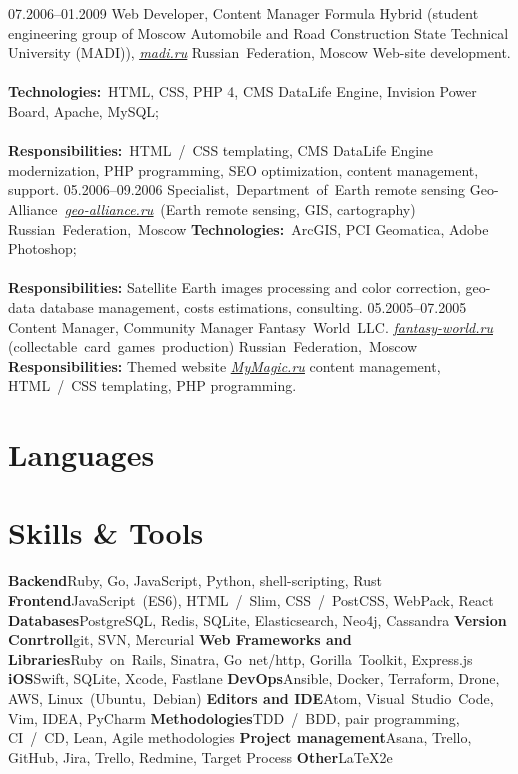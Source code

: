 \documentclass[12pt,a4paper,final]{moderncv}
\begin{document}
\newpage
\cventry
{07.2006--01.2009}
{Web Developer, Content Manager}
{
  Formula Hybrid (student engineering group of Moscow Automobile and Road Construction State Technical University (MADI)), \underline{\href{http://madi.ru}{\itshape madi.ru}}
}
{Russian~Federation, Moscow}
{}
{
  Web-site development.
  \\\\
  \textbf{Technologies:}~HTML, CSS, PHP 4, CMS DataLife Engine, Invision Power Board, Apache, MySQL;
  \\\\
  \textbf{Responsibilities:}~HTML~/~CSS templating, CMS DataLife Engine modernization, PHP programming, SEO optimization, content management, support.
}
%
\cventry
{05.2006--09.2006}
{Specialist,~Department~of~Earth remote sensing}
{Geo-Alliance~\underline{\href{http://geo-alliance.ru}{\itshape geo-alliance.ru}}~(Earth remote sensing, GIS, cartography)}
{Russian~Federation,~Moscow}
{}
{
\textbf{Technologies:}~ArcGIS, PCI Geomatica, Adobe Photoshop;
\\\\
\textbf{Responsibilities:} Satellite Earth images processing and color correction, geo-data database management, costs estimations, consulting.
}
%
\cventry
{05.2005--07.2005}
{Content Manager, Community Manager}
{Fantasy~World~LLC. \underline{\href{http://fantasy-world.ru}{\itshape fantasy-world.ru}} (collectable~card~games~production)}
{Russian~Federation,~Moscow}
{}
{
  \textbf{Responsibilities:} Themed website \underline{\href{http://mymagic.ru}{\itshape MyMagic.ru}} content management, HTML~/~CSS templating, PHP programming.
}

\section{Languages}

\section{Skills \& Tools}
\cvcomputer
{\textbf{Backend}}{Ruby, Go, JavaScript, Python, shell-scripting, Rust}
{\textbf{Frontend}}{JavaScript~(ES6), HTML~/~Slim, CSS~/~PostCSS, WebPack, React}
%
\cvcomputer
{\textbf{Databases}}{PostgreSQL, Redis, SQLite, Elasticsearch, Neo4j, Cassandra}
{\textbf{Version Conrtroll}}{git, SVN, Mercurial}
%
\cvcomputer
{\textbf{Web Frameworks and Libraries}}{Ruby~on~Rails, Sinatra, Go~net/http, Gorilla~Toolkit, Express.js}
{\textbf{iOS}}{Swift, SQLite, Xcode, Fastlane}
%
\cvcomputer
{\textbf{DevOps}}{Ansible, Docker, Terraform, Drone, AWS, Linux~(Ubuntu,~Debian)}
{\textbf{Editors and IDE}}{Atom, Visual~Studio~Code, Vim, IDEA, PyCharm}
%
\cvcomputer
{\textbf{Methodologies}}{TDD~/~BDD, pair programming, CI~/~CD, Lean, Agile methodologies}
{\textbf{Project management}}{Asana, Trello, GitHub, Jira, Trello, Redmine, Target Process}
%
\cvcomputer
{\textbf{Other}}{\LaTeX2e}{}{}
\newpage
\end{document}
